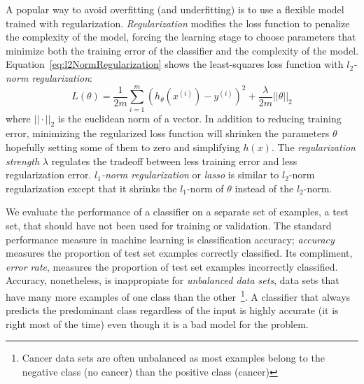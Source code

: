 A popular way to avoid overfitting (and underfitting) is to use a flexible model trained with regularization. \emph{Regularization} modifies the loss function to penalize the complexity of the model, forcing the learning stage to choose parameters that minimize both the training error of the classifier and the complexity of the model. Equation~\ref{eq:l2NormRegularization} shows the least-squares loss function with \emph{$l_2$-norm regularization}:
\begin{equation}
	L(\theta) =  \frac{1}{2m}\sum_{i=1}^m(h_\theta(x^{(i)}) - y^{(i)})^2 + \frac{\lambda}{2m} ||\theta||_2
	\label{eq:l2NormRegularization}
\end{equation}
where $||\cdot||_2$ is the euclidean norm of a vector. In addition to reducing training error, minimizing the regularized loss function will shrinken the parameters $\theta$ hopefully setting some of them to zero and simplifying $h(x)$. The \emph{regularization strength} $\lambda$ regulates the tradeoff between less training error and less regularization error. \emph{$l_1$-norm regularization} or \emph{lasso} is similar to $l_2$-norm regularization except that it shrinks the $l_1$-norm of $\theta$ instead of the $l_2$-norm.

We evaluate the performance of a classifier on a separate set of examples, a test set, that should have not been used for training or validation. The standard performance measure in machine learning is classification accuracy; \emph{accuracy} measures the proportion of test set examples correctly classified. Its compliment, \emph{error rate}, measures the proportion of test set examples incorrectly classified. Accuracy, nonetheless, is inappropiate for \emph{unbalanced data sets}, data sets that have many more examples of one class than the other~\footnote{Cancer data sets are often unbalanced as most examples belong to the negative class (no cancer) than the positive class (cancer)}. A classifier that always predicts the predominant class regardless of the input is highly accurate (it is right most of the time) even though it is a bad model for the problem.

